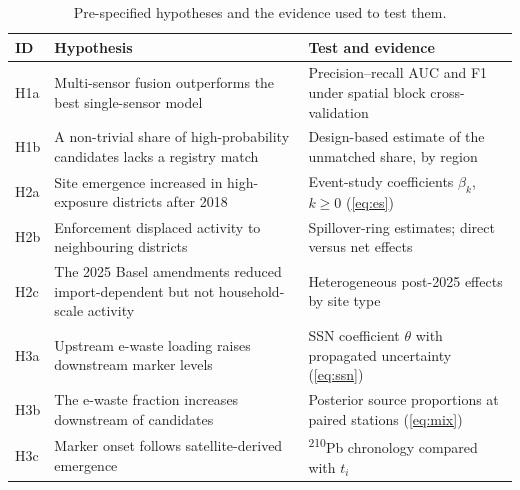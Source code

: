 \begin{table}[t]
\centering
\caption{Pre-specified hypotheses and the evidence used to test them.}
\label{tab:hypotheses}
\footnotesize
\begin{tabularx}{\textwidth}{@{}L{0.75cm}YL{5.7cm}@{}}
\toprule
ID & Hypothesis & Test and evidence\\
\midrule
H1a & Multi-sensor fusion outperforms the best single-sensor model & Precision--recall AUC and F1 under spatial block cross-validation\\
H1b & A non-trivial share of high-probability candidates lacks a registry match & Design-based estimate of the unmatched share, by region\\
H2a & Site emergence increased in high-exposure districts after 2018 & Event-study coefficients $\beta_k$, $k\ge0$ (\cref{eq:es})\\
H2b & Enforcement displaced activity to neighbouring districts & Spillover-ring estimates; direct versus net effects\\
H2c & The 2025 Basel amendments reduced import-dependent but not household-scale activity & Heterogeneous post-2025 effects by site type\\
H3a & Upstream e-waste loading raises downstream marker levels & SSN coefficient $\theta$ with propagated uncertainty (\cref{eq:ssn})\\
H3b & The e-waste fraction increases downstream of candidates & Posterior source proportions at paired stations (\cref{eq:mix})\\
H3c & Marker onset follows satellite-derived emergence & \textsuperscript{210}Pb chronology compared with $t_i$\\
\bottomrule
\end{tabularx}
\end{table}
